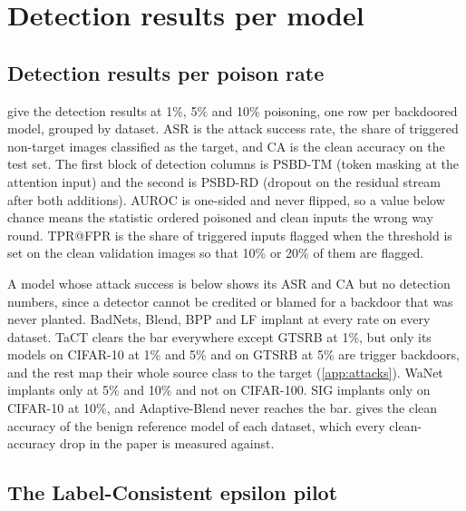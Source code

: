 \section{Detection results per model}
\label{supp:results}

\subsection{Detection results per poison rate}
\label{app:results}

 give the detection results at 1\%, 5\% and 10\% poisoning, one row per backdoored model, grouped by dataset. ASR is the attack success rate, the share of triggered non-target images classified as the target, and CA is the clean accuracy on the test set. The first block of detection columns is PSBD-TM (token masking at the attention input) and the second is PSBD-RD (dropout on the residual stream after both additions). AUROC is one-sided and never flipped, so a value below chance means the statistic ordered poisoned and clean inputs the wrong way round. TPR@FPR is the share of triggered inputs flagged when the threshold is set on the \HeldoutSize{} clean validation images so that 10\% or 20\% of them are flagged.

A model whose attack success is below \AsrBar{} shows its ASR and CA but no detection numbers, since a detector cannot be credited or blamed for a backdoor that was never planted. BadNets, Blend, BPP and LF implant at every rate on every dataset. TaCT clears the bar everywhere except GTSRB at 1\%, but only its models on CIFAR-10 at 1\% and 5\% and on GTSRB at 5\% are trigger backdoors, and the rest map their whole source class to the target (\cref{app:attacks}). WaNet implants only at 5\% and 10\% and not on CIFAR-100. SIG implants only on CIFAR-10 at 10\%, and Adaptive-Blend never reaches the bar.  gives the clean accuracy of the benign reference model of each dataset, which every clean-accuracy drop in the paper is measured against.





\FloatBarrier

\subsection{The Label-Consistent epsilon pilot}
\label{supp:lc-epsilon}

